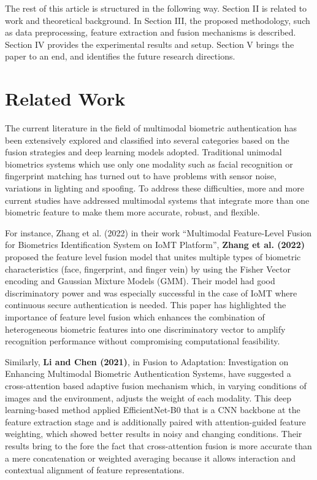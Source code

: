 \documentclass[12pt,a4paper]{report}
\begin{document}
The rest of this article is structured in the following way. Section II is related to work and theoretical background. In Section III, the proposed methodology, such as data preprocessing, feature extraction and fusion mechanisms is described. Section IV provides the experimental results and setup. Section V brings the paper to an end, and identifies the future research directions.

\section{Related Work}
The current literature in the field of multimodal biometric authentication has been extensively explored and classified into several categories based on the fusion strategies and deep learning models adopted. Traditional unimodal biometrics systems which use only one modality such as facial recognition or fingerprint matching has turned out to have problems with sensor noise, variations in lighting and spoofing. To address these difficulties, more and more current studies have addressed multimodal systems that integrate more than one biometric feature to make them more accurate, robust, and flexible.

For instance, Zhang et al. (2022) in their work “Multimodal Feature-Level Fusion for Biometrics Identification System on IoMT Platform”, \textbf{Zhang et al. (2022)} proposed the feature level fusion model that unites multiple types of biometric characteristics (face, fingerprint, and finger vein) by using the Fisher Vector encoding and Gaussian Mixture Models (GMM). Their model had good discriminatory power and was especially successful in the case of IoMT where continuous secure authentication is needed. This paper has highlighted the importance of feature level fusion which enhances the combination of heterogeneous biometric features into one discriminatory vector to amplify recognition performance without compromising computational feasibility.

Similarly, \textbf{Li and Chen (2021)}, in Fusion to Adaptation: Investigation on Enhancing Multimodal Biometric Authentication Systems, have suggested a cross-attention based adaptive fusion mechanism which, in varying conditions of images and the environment, adjusts the weight of each modality. This deep learning-based method applied EfficientNet-B0 that is a CNN backbone at the feature extraction stage and is additionally paired with attention-guided feature weighting, which showed better results in noisy and changing conditions. Their results bring to the fore the fact that cross-attention fusion is more accurate than a mere concatenation or weighted averaging because it allows interaction and contextual alignment of feature representations.
\end{document}
